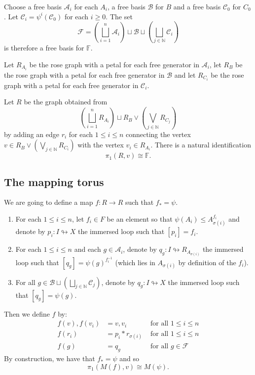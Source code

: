 \documentclass[11pt, a4paper]{amsart}
\theoremstyle{definition}
\newcommand{\isom}{\cong}
\newcommand{\N}{\mathbb{N}}
\newcommand{\F}{\mathbb{F}}
\def\immerses{\looparrowright}
\begin{document}
Choose a free basis $\mathcal{A}_i$ for each $A_i$, a free basis $\mathcal{B}$ for $B$ and a free basis $\mathcal{C}_0$ for $C_0$. Let $\mathcal{C}_i = \psi^i(\mathcal{C}_0)$ for each $i\geqslant 0$. The set
\[
\mathcal{F} = \left(\bigsqcup_{i=1}^n\mathcal{A}_i\right)\sqcup\mathcal{B}\sqcup\left(\bigsqcup_{j\in \N}\mathcal{C}_i\right)
\]
is therefore a free basis for $\F$.

Let $R_{A_i}$ be the rose graph with a petal for each free generator in $\mathcal{A}_i$, let $R_B$ be the rose graph with a petal for each free generator in  $\mathcal{B}$ and let $R_{C_i}$ be the rose graph with a petal for each free generator in $\mathcal{C}_i$. 

Let $R$ be the graph obtained from 
\[
\left(\bigsqcup_{i=1}^nR_{A_i}\right)\sqcup R_{B}\vee\left(\bigvee_{j\in \N}R_{C_j}\right)
\]
by adding an edge $r_i$ for each $1\leqslant i\leqslant n$ connecting the vertex $v\in R_{B}\vee\left(\bigvee_{j\in \N}R_{C_i}\right)$ with the vertex $v_i\in R_{A_i}$. There is a natural identification
\[
\pi_1(R, v) \isom \F.
\]

\subsection*{The mapping torus}

We are going to define a map $f\colon R\to R$ such that $f_* = \psi$.
\begin{enumerate}
\item For each $1\leqslant i\leqslant n$, let $f_i\in F$ be an element so that $\psi(A_i) \leqslant A_{\sigma(i)}^{f_i}$ and denote by $p_i\colon I\immerses X$ the immersed loop such that $[p_i] = f_i$.
\item For each $1\leqslant i\leqslant n$ and each $g\in \mathcal{A}_i$, denote by $q_g\colon I\immerses R_{A_{\sigma(i)}}$ the immersed loop such that $[q_g] = \psi(g)^{f_i^{-1}}$ (which lies in $A_{\sigma(i)}$ by definition of the $f_i$).
\item For all $g\in \mathcal{B}\sqcup\left(\bigsqcup_{j\in \N}\mathcal{C}_j\right)$, denote by $q_g\colon I\immerses X$ the immersed loop such that $[q_g] = \psi(g)$.
\end{enumerate}
Then we define $f$ by:
\begin{align*}
f(v), f(v_i) &= v, v_{i}  & \text{ for all $1\leqslant i\leqslant n$}\\
f(r_i) &= p_i*r_{\sigma(i)} & \text{ for all $1\leqslant i\leqslant n$}\\
f(g) &= q_g & \text{ for all $g\in \mathcal{F}$}
\end{align*}
By construction, we have that $f_* = \psi$ and so
\[
\pi_1(M(f), v) \isom M(\psi).
\]
\end{document}
